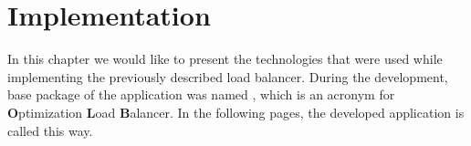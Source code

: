 \chapter{Implementation}\label{ch:implementation}
In this chapter we would like to present the technologies that were used while implementing the previously described load balancer.
During the development,
base package of the application was named ,
which is an acronym for \textbf{O}ptimization \textbf{L}oad \textbf{B}alancer.
In the following pages, 
the developed application is called this way.







